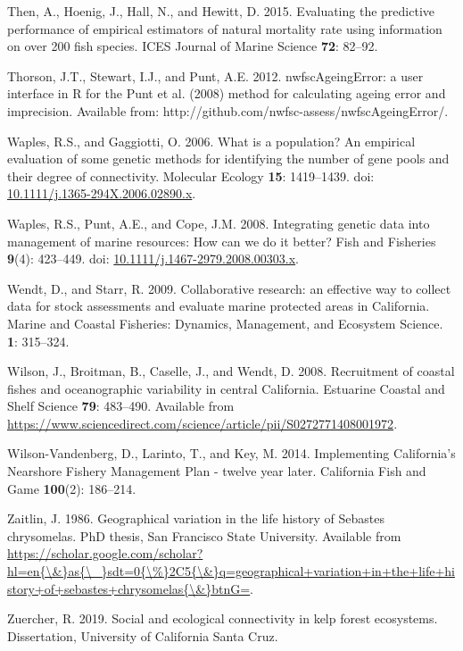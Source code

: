 \documentclass[12pt,]{article}
\begin{document}
\hypertarget{ref-Then2015}{}
Then, A., Hoenig, J., Hall, N., and Hewitt, D. 2015. Evaluating the
predictive performance of empirical estimators of natural mortality rate
using information on over 200 fish species. ICES Journal of Marine
Science \textbf{72}: 82--92.

\hypertarget{ref-Thorson2012}{}
Thorson, J.T., Stewart, I.J., and Punt, A.E. 2012. nwfscAgeingError: a
user interface in R for the Punt et al. (2008) method for calculating
ageing error and imprecision. Available from:
http://github.com/nwfsc-assess/nwfscAgeingError/.

\hypertarget{ref-Waples2006}{}
Waples, R.S., and Gaggiotti, O. 2006. What is a population? An empirical
evaluation of some genetic methods for identifying the number of gene
pools and their degree of connectivity. Molecular Ecology \textbf{15}:
1419--1439. doi:
\href{https://doi.org/10.1111/j.1365-294X.2006.02890.x}{10.1111/j.1365-294X.2006.02890.x}.

\hypertarget{ref-Waples2008}{}
Waples, R.S., Punt, A.E., and Cope, J.M. 2008. Integrating genetic data
into management of marine resources: How can we do it better? Fish and
Fisheries \textbf{9}(4): 423--449. doi:
\href{https://doi.org/10.1111/j.1467-2979.2008.00303.x}{10.1111/j.1467-2979.2008.00303.x}.

\hypertarget{ref-Wendt2009}{}
Wendt, D., and Starr, R. 2009. Collaborative research: an effective way
to collect data for stock assessments and evaluate marine protected
areas in California. Marine and Coastal Fisheries: Dynamics, Management,
and Ecosystem Science. \textbf{1}: 315--324.

\hypertarget{ref-Wilson2008}{}
Wilson, J., Broitman, B., Caselle, J., and Wendt, D. 2008. Recruitment
of coastal fishes and oceanographic variability in central California.
Estuarine Coastal and Shelf Science \textbf{79}: 483--490. Available
from
\url{https://www.sciencedirect.com/science/article/pii/S0272771408001972}.

\hypertarget{ref-Vandenberg2014}{}
Wilson-Vandenberg, D., Larinto, T., and Key, M. 2014. Implementing
California's Nearshore Fishery Management Plan - twelve year later.
California Fish and Game \textbf{100}(2): 186--214.

\hypertarget{ref-Zaitlin1986}{}
Zaitlin, J. 1986. Geographical variation in the life history of Sebastes
chrysomelas. PhD thesis, San Francisco State University. Available from
\href{https://scholar.google.com/scholar?hl=en\%7B/\&\%7Das\%7B/_\%7Dsdt=0\%7B/\%\%7D2C5\%7B/\&\%7Dq=geographical+variation+in+the+life+history+of+sebastes+chrysomelas\%7B/\&\%7DbtnG=}{https://scholar.google.com/scholar?hl=en\{\textbackslash{}\&\}as\{\textbackslash{}\_\}sdt=0\{\textbackslash{}\%\}2C5\{\textbackslash{}\&\}q=geographical+variation+in+the+life+history+of+sebastes+chrysomelas\{\textbackslash{}\&\}btnG=}.

\hypertarget{ref-Zuercher2019}{}
Zuercher, R. 2019. Social and ecological connectivity in kelp forest
ecosystems. Dissertation, University of California Santa Cruz.
\end{document}
